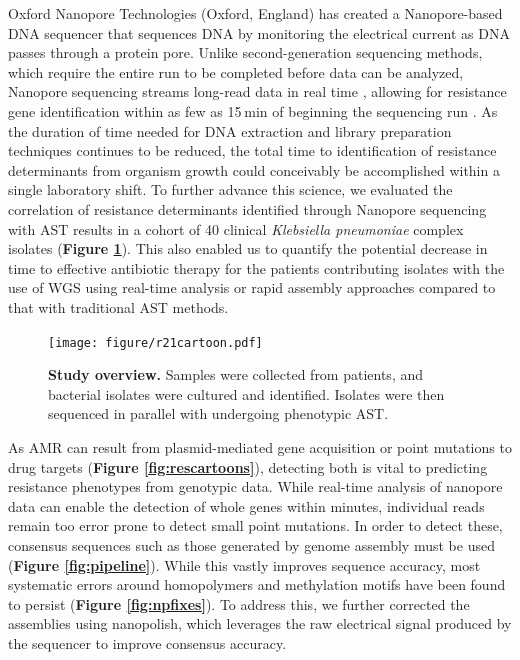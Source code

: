 Oxford Nanopore Technologies (Oxford, England) has created a Nanopore-based DNA sequencer that sequences DNA by monitoring the electrical current as DNA passes through a protein pore. Unlike second-generation sequencing methods, which require the entire run to be completed before data can be analyzed, Nanopore sequencing streams long-read data in real time \citep{Cao2016-oj}, allowing for resistance gene identification within as few as 15 min of beginning the sequencing run \citep{Schmidt2017-ng, Lemon2017-td, Judge2015-zw}. As the duration of time needed for DNA extraction and library preparation techniques continues to be reduced, the total time to identification of resistance determinants from organism growth could conceivably be accomplished within a single laboratory shift. To further advance this science, we evaluated the correlation of resistance determinants identified through Nanopore sequencing with AST results in a cohort of 40 clinical \textit{Klebsiella pneumoniae} complex isolates ({\bf Figure \ref{fig:r21cartoon}}). This also enabled us to quantify the potential decrease in time to effective antibiotic therapy for the patients contributing isolates with the use of WGS using real-time analysis or rapid assembly approaches compared to that with traditional AST methods.



\begin{figure}[!ht]
\centering
\texttt{[image: figure/r21cartoon.pdf]}
\caption[Study overview]{{\bf Study overview.} Samples were collected from patients, and bacterial isolates were cultured and identified. Isolates were then sequenced in parallel with undergoing phenotypic AST. }
\label{fig:r21cartoon}
\end{figure}


As AMR can result from plasmid-mediated gene acquisition or point mutations to drug targets ({\bf Figure \ref{fig:rescartoons}}), detecting both is vital to predicting resistance phenotypes from genotypic data. While real-time analysis of nanopore data can enable the detection of whole genes within minutes, individual reads remain too error prone to detect small point mutations. In order to detect these, consensus sequences such as those generated by genome assembly must be used ({\bf Figure \ref{fig:pipeline}}). While this vastly improves sequence accuracy, most systematic errors around homopolymers and methylation motifs have been found to persist ({\bf Figure \ref{fig:npfixes}}). To address this, we further corrected the assemblies using nanopolish, which leverages the raw electrical signal produced by the sequencer to improve consensus accuracy.

